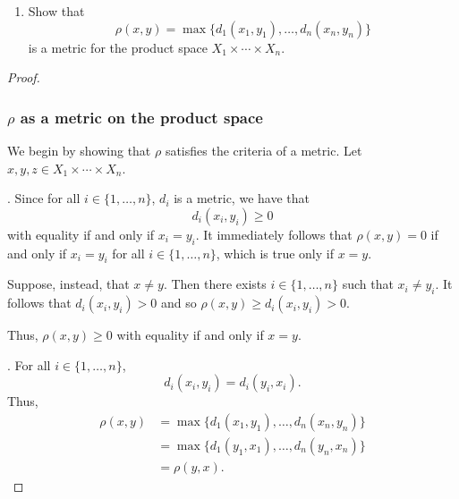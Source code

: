 \begin{solution}
  \begin{enumerate}[label={(\alph*)}, align=left, leftmargin=\parindent, listparindent=\parindent, labelwidth=0pt, itemindent=!]
    \item
      Show that
      \begin{equation*}
        \rho(x, y) = \max\{ d_1(x_1, y_1), \ldots, d_n(x_n, y_n) \}
      \end{equation*}
      is a metric for the product space $X_1 \times \cdots \times X_n$.
  \end{enumerate}
  \begin{proof}~

    \subsubsection*{$\rho$ as a metric on the product space}
    We begin by showing that $\rho$ satisfies the criteria of a metric.
    Let $x, y, z \in X_1 \times \cdots \times X_n$.
    \bigskip

    . Since for all $i \in \{1, \ldots, n\}$, $d_i$ is a metric, we have that
    \begin{equation*}
      d_i(x_i, y_i) \geq 0
    \end{equation*}
    with equality if and only if $x_i = y_i$.
    It immediately follows that $\rho(x, y) = 0$ if and only if $x_i = y_i$ for all $i \in \{1, \ldots, n\}$, which is true only if $x = y$.

    Suppose, instead, that $x \neq y$.
    Then there exists $i \in \{1, \ldots, n\}$ such that $x_i \neq y_i$.
    It follows that $d_i(x_i, y_i) > 0$ and so $\rho(x, y) \geq d_i(x_i, y_i) > 0$.

    Thus, $\rho(x, y) \geq 0$ with equality if and only if $x = y$.
    \bigskip

    . For all $i \in \{1, \ldots, n\}$,
    \begin{equation*}
      d_i(x_i, y_i) = d_i(y_i, x_i).
    \end{equation*}
    Thus,
    \begin{align*}
      \rho(x, y)  &= \max\{ d_1(x_1, y_1), \ldots, d_n(x_n, y_n) \} \\
                  &= \max\{ d_1(y_1, x_1), \ldots, d_n(y_n, x_n) \} \\
                  &= \rho(y, x).
    \end{align*}
    \bigskip


\end{proof}
\end{solution}
